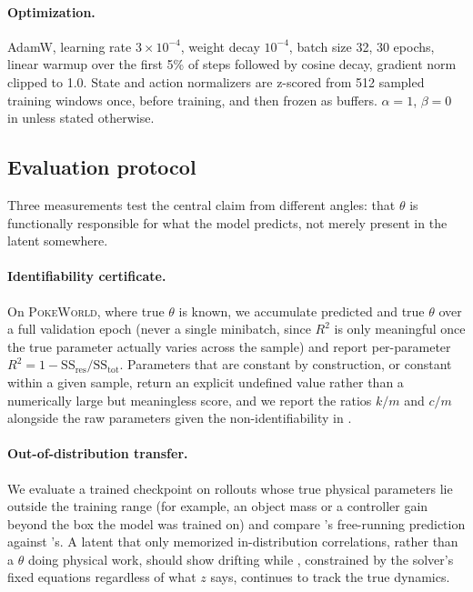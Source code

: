 \paragraph{Optimization.} AdamW, learning rate $3\times10^{-4}$,
weight decay $10^{-4}$, batch size 32, 30 epochs, linear warmup over
the first 5\% of steps followed by cosine decay, gradient norm clipped
to 1.0. State and action normalizers are z-scored from 512 sampled
training windows once, before training, and then frozen as buffers.
$\alpha{=}1$, $\beta{=}0$ in  unless stated otherwise.

\subsection{Evaluation protocol}
\label{sec:setup-protocol}

Three measurements test the central claim from different angles: that
$\theta$ is functionally responsible for what the model predicts, not
merely present in the latent somewhere.

\paragraph{Identifiability certificate.} On \textsc{PokeWorld}, where
true $\theta$ is known, we accumulate predicted and true $\theta$ over
a full validation epoch (never a single minibatch, since $R^2$ is only
meaningful once the true parameter actually varies across the sample)
and report per-parameter $R^2 = 1 - \mathrm{SS}_{\mathrm{res}} /
\mathrm{SS}_{\mathrm{tot}}$. Parameters that are constant by
construction, or constant within a given sample, return an explicit
undefined value rather than a numerically large but meaningless score,
and we report the ratios $k/m$ and $c/m$ alongside the raw parameters
given the non-identifiability in .

\paragraph{Out-of-distribution transfer.} We evaluate a trained
checkpoint on rollouts whose true physical parameters lie outside the
training range (for example, an object mass or a controller gain
beyond the box the model was trained on) and compare \pathA's
free-running prediction against \pathB's. A latent that only memorized
in-distribution correlations, rather than a $\theta$ doing physical
work, should show \pathA drifting while \pathB, constrained by the
solver's fixed equations regardless of what $z$ says, continues to
track the true dynamics.

